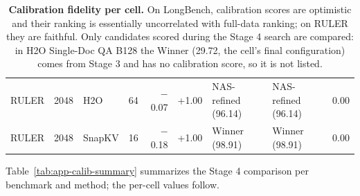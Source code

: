 \begin{table}[t]
\begin{tabular}{@{}l r l r r r l l r@{}}
    RULER & 2048 & H2O & 64 & $-$0.07 & +1.00 & NAS-refined (96.14) & NAS-refined (96.14) & 0.00 \\
    RULER & 2048 & SnapKV & 16 & $-$0.18 & +1.00 & Winner (98.91) & Winner (98.91) & 0.00 \\
    \bottomrule
  \end{tabular}
  \caption{\textbf{Calibration fidelity per cell.} On LongBench, calibration scores are optimistic and their ranking is essentially uncorrelated with full-data ranking; on RULER they are faithful. Only candidates scored during the Stage 4 search are compared: in H2O Single-Doc QA B128 the Winner (29.72, the cell's final configuration) comes from Stage 3 and has no calibration score, so it is not listed.}
  \label{tab:app-calib}
\end{table}


Table~\ref{tab:app-calib-summary} summarizes the Stage 4 comparison per benchmark and method; the per-cell values follow.

\begin{table}[!htbp]
  \centering
  \footnotesize\setlength{\tabcolsep}{2.5pt}
  
  \caption{\textbf{Stage 4 calibration (10\% subset) vs.\ full-data scores, summary.} Cells: (task, budget) pairs. Gap: mean calibration minus full-data score. $\tau$: mean Kendall correlation between the two rankings of each cell's re-evaluated configurations. Picks: cells where the calibration-best candidate is also full-data best. Regret: mean full-data points lost by trusting calibration.}
  \label{tab:app-calib-summary}
\end{table}

